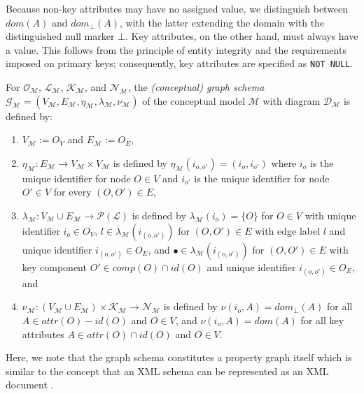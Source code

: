 \documentclass[sigconf]{acmart}
\begin{document}
Because non-key attributes may have no assigned value, we distinguish between $\textit{dom}(A)$ and $\textit{dom}_{\bot}(A)$, with the latter extending the domain with the distinguished null marker $\bot$. Key attributes, on the other hand, must always have a value. This follows from the principle of entity integrity and the requirements imposed on primary keys; consequently, key attributes are specified as \texttt{NOT NULL}.

For $\mathcal{O}_\mathcal{M}$, $\mathcal{L}_\mathcal{M}$, $\mathcal{K}_\mathcal{M}$, and $\mathcal{N}_\mathcal{M}$, the \emph{(conceptual) graph schema} $\mathcal{G}_\mathcal{M}=(V_\mathcal{M},E_\mathcal{M},\eta_\mathcal{M},\lambda_\mathcal{M},\nu_\mathcal{M})$ of the conceptual model $\mathcal{M}$ with diagram $\mathcal{D_M}$ is defined by:
\begin{enumerate}
\item $V_\mathcal{M}:=O_V$ and $E_\mathcal{M}:=O_E$, 
\item $\eta_\mathcal{M}: E_\mathcal{M}\rightarrow V_\mathcal{M}\times V_\mathcal{M}$ is defined by $\eta_\mathcal{M}(i_{o,o'})=(i_o,i_{o'})$ where $i_o$ is the unique identifier for node $O\in V$ and $i_{o'}$ is the unique identifier for node $O'\in V$ for every $(O,O')\in E$, 
\item $\lambda_\mathcal{M}:V_\mathcal{M}\cup E_\mathcal{M}\rightarrow\mathcal{P}(\mathcal{L})$ is defined by $\lambda_\mathcal{M}(i_o)=\{O\}$ for $O\in V$ with unique identifier $i_o\in O_V$, $l\in \lambda_\mathcal{M}(i_{(o,o')})$ for $(O,O')\in E$ with edge label $l$ and unique identifier $i_{(o,o')}\in O_E$, and $\bullet\in \lambda_\mathcal{M}(i_{(o,o')})$ for $(O,O')\in E$ with key component $O'\in\textit{comp}(O)\cap\textit{id}(O)$ and unique identifier $i_{(o,o')}\in O_E$, and 
\item $\nu_\mathcal{M}: (V_\mathcal{M}\cup E_\mathcal{M})\times\mathcal{K}_\mathcal{M}\rightarrow\mathcal{N}_\mathcal{M}$ is defined by $\nu(i_o,A)=\textit{dom}_{\bot}(A)$ for all $A\in\textit{attr}(O)-\textit{id}(O)$ and $O\in V$, and $\nu(i_o,A)=\textit{dom}(A)$ for all key attributes $A\in\textit{attr}(O)\cap\textit{id}(O)$ and $O\in V$.
\end{enumerate}



Here, we note that the graph schema constitutes a property graph itself which is similar to the concept that an XML schema can be represented as an XML document \cite{W3C_XML_Schema}.
\end{document}

